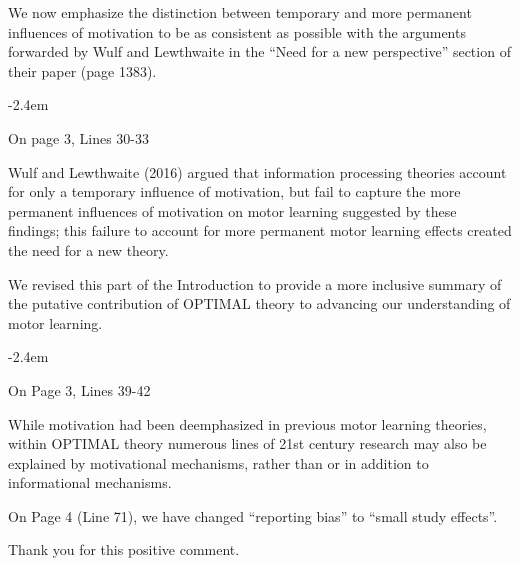 \documentclass[final]{article}
\renewenvironment{quote}{\begin{fquote}\advance\leftmargini -2.4em\begin{oldquote}}{\end{oldquote}\end{fquote}}
\newenvironment{fquote}
  {\def\FrameCommand{
	\fboxsep=0.6em %
	\fcolorbox{black}{white}}%
    \MakeFramed {\advance\hsize-2\width \FrameRestore}
    \begin{minipage}{\linewidth}
  }
  {\end{minipage}\endMakeFramed}
\begin{document}
We now emphasize the distinction between temporary and more permanent influences of motivation to be as consistent as possible with the arguments forwarded by Wulf and Lewthwaite in the ``Need for a new perspective'' section of their paper (page 1383).

\begin{quote}
On page 3, Lines 30-33

Wulf and Lewthwaite (2016) argued that information processing theories account for only a temporary influence of motivation, but fail to capture the more permanent influences of motivation on motor learning suggested by these findings; this failure to account for more permanent motor learning effects created the need for a new theory.
\end{quote}


We revised this part of the Introduction to provide a more inclusive summary of the putative contribution of OPTIMAL theory to advancing our understanding of motor learning.

\begin{quote}
On Page 3, Lines 39-42

While motivation had been deemphasized in previous motor learning theories, within OPTIMAL theory numerous lines of 21st century research may also be explained by motivational mechanisms, rather than or in addition to informational mechanisms.
\end{quote}


On Page 4 (Line 71), we have changed ``reporting bias'' to ``small study effects''.


Thank you for this positive comment.

\end{document}
